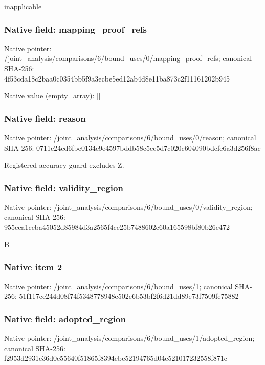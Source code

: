 \documentclass[10pt,a4paper]{article}
\begin{document}
\begingroup\raggedright\sloppy inapplicable\par\endgroup

\subsubsection{Native field: mapping\_\allowbreak{}proof\_\allowbreak{}refs}
Native pointer: /joint\_\allowbreak{}analysis/comparisons/6/bound\_\allowbreak{}uses/0/mapping\_\allowbreak{}proof\_\allowbreak{}refs; canonical SHA-256: 4f53cda18c2baa0c0354bb5f9a3ecbe5ed12ab4d8e11ba873c2f11161202b945

Native value (empty\_\allowbreak{}array): []

\subsubsection{Native field: reason}
Native pointer: /joint\_\allowbreak{}analysis/comparisons/6/bound\_\allowbreak{}uses/0/reason; canonical SHA-256: 0711c24cd6fbe0134e9e4597bddb58c5ec5d7c020c604090bdcfe6a3d256f8ac

\begingroup\raggedright\sloppy Registered accuracy guard excludes Z.\par\endgroup

\subsubsection{Native field: validity\_\allowbreak{}region}
Native pointer: /joint\_\allowbreak{}analysis/comparisons/6/bound\_\allowbreak{}uses/0/validity\_\allowbreak{}region; canonical SHA-256: 955cca1ceba45052d85984d3a2565f4ce25b7488602c60a165598bf80b26e472

\begingroup\raggedright\sloppy B\par\endgroup

\subsubsection{Native item 2}
Native pointer: /joint\_\allowbreak{}analysis/comparisons/6/bound\_\allowbreak{}uses/1; canonical SHA-256: 51f117cc244d08f74f5348778948e502e6b53bf2f6d21dd89e73f7509fe75882

\subsubsection{Native field: adopted\_\allowbreak{}region}
Native pointer: /joint\_\allowbreak{}analysis/comparisons/6/bound\_\allowbreak{}uses/1/adopted\_\allowbreak{}region; canonical SHA-256: f2953d2931e36d0c55640f51865f8394ebe52194765d04e521017232558f871c
\end{document}

